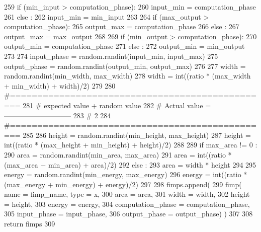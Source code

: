 \begin{DoxyCode}
259       \textcolor{keywordflow}{if} (min\_input > computation\_phase):
260         input\_min = computation\_phase
261       \textcolor{keywordflow}{else} :
262         input\_min = min\_input
263 
264       \textcolor{keywordflow}{if} (max\_output > computation\_phase):
265         output\_max = computation\_phase
266       \textcolor{keywordflow}{else} :
267         output\_max = max\_output
268 
269       \textcolor{keywordflow}{if} (min\_output > computation\_phase):
270         output\_min = computation\_phase
271       \textcolor{keywordflow}{else} :
272         output\_min = min\_output
273 
274       input\_phase = random.randint(input\_min, input\_max)
275       output\_phase = random.randint(output\_min, output\_max)
276 
277       width = random.randint(min\_width, max\_width)
278       width = int((ratio * (max\_width + min\_width) + width)/2)
279 
280       \textcolor{comment}{#================================================}
281       \textcolor{comment}{#                expected value + random value}
282       \textcolor{comment}{# Actual value = -----------------------------}
283       \textcolor{comment}{#                               2}
284       \textcolor{comment}{#================================================}
285 
286       height = random.randint(min\_height, max\_height)
287       height = int((ratio * (max\_height + min\_height) + height)/2)
288 
289       \textcolor{keywordflow}{if} max\_area != 0 :
290         area = random.randint(min\_area, max\_area)
291         area = int((ratio * (max\_area + min\_area) + area)/2)
292       \textcolor{keywordflow}{else} :
293         area = width * height
294 
295       energy = random.randint(min\_energy, max\_energy)
296       energy = int((ratio * (max\_energy + min\_energy) + energy)/2)
297 
298       fimps.append(
299         fimp( name = fimp\_name, type = x,
300               area = area,
301               width = width,
302               height = height,
303               energy = energy,
304               computation\_phase = computation\_phase,
305               input\_phase = input\_phase,
306               output\_phase = output\_phase) )
307 
308     \textcolor{keywordflow}{return} fimps
309 
\end{DoxyCode}
\mbox{\label{namespacesylva_1_1base_1_1fimp_a49222336c8f368ae3381e7b8b456a8b4}} 
